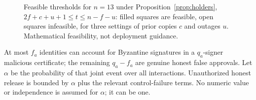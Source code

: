 \documentclass[pdflatex,sn-mathphys-num,twocolumn]{sn-jnl}
\theoremstyle{plain}
\theoremstyle{definition}
\begin{document}
\begin{figure}[t]
\centering

\caption{Feasible thresholds for $n=13$ under Proposition~\ref{prop:holders}, $2f+c+u+1\le t\le n-f-u$: filled squares are feasible, open squares infeasible, for three settings of prior copies $c$ and outages $u$. Mathematical feasibility, not deployment guidance.}\label{fig:feasible}
\end{figure}



At most $f_a$ identities can account for Byzantine signatures in a $q_a$-signer malicious certificate; the remaining $q_a-f_a$ are genuine honest false approvals. Let $\alpha$ be the probability of that joint event over all interactions. Unauthorized honest release is bounded by $\alpha$ plus the relevant control-failure terms. No numeric value or independence is assumed for $\alpha$; it can be one.
\end{document}
